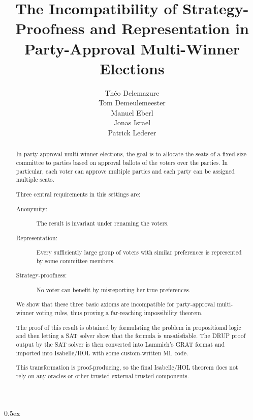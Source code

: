 \documentclass[11pt,a4paper]{scrartcl}
\begin{document}
\title{The Incompatibility of Strategy-Proofness and Representation in Party-Approval Multi-Winner Elections}
\author{Th\'eo Delemazure\\
Tom Demeulemeester\\
Manuel Eberl\\
Jonas Israel\\
Patrick Lederer}
\maketitle

\begin{abstract}
In party-approval multi-winner elections, the goal is to allocate the seats of a fixed-size
committee to parties based on approval ballots of the voters over the parties. In particular, each
voter can approve multiple parties and each party can be assigned multiple seats.

Three central requirements in this settings are:
\begin{description}
\item[Anonymity:] The result is invariant under renaming the voters.
\item[Representation:] Every sufficiently large group of voters with similar
preferences is represented by some committee members.
\item[Strategy-proofness:] No voter can benefit by misreporting her true preferences.
\end{description}
We show that these three basic axioms are incompatible for party-approval multi-winner voting rules,
thus proving a far-reaching impossibility theorem.

The proof of this result is obtained by
formulating the problem in propositional logic and then letting a SAT solver show that the
formula is unsatisfiable. The DRUP proof output by the SAT solver is then converted into
Lammich's GRAT format and imported into Isabelle/HOL with some custom-written ML code.

This transformation is proof-producing, so the final Isabelle/HOL theorem does not rely on any oracles
or other trusted external trusted components.
\end{abstract}

\newpage
\tableofcontents
\newpage
\parindent 0pt\parskip 0.5ex





\end{document}
